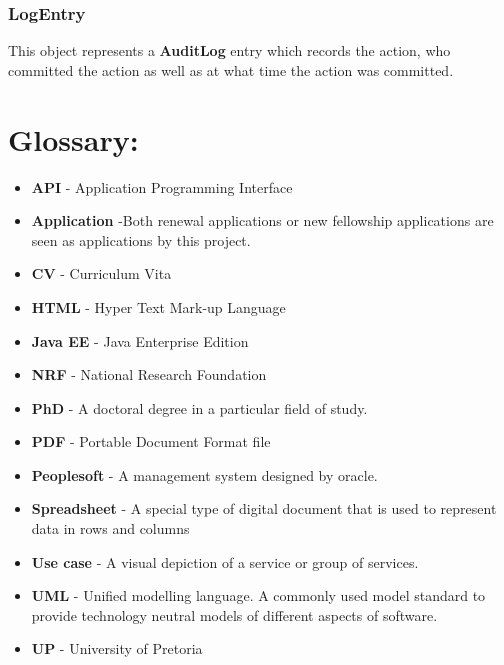 \documentclass[12pt]{article}
\begin{document}
\subsubsection{LogEntry}
This object represents a \textbf{AuditLog} entry which records the action, who committed the action as well as at what time the action was committed.



\newpage	

\newpage
\section{Glossary:}
\vspace{0.2in}

\begin{itemize}

\item \textbf{API} - Application Programming Interface
\item \textbf{Application} -Both renewal applications or new fellowship applications are seen as applications by this project.
\item \textbf{CV} - Curriculum Vita
\item \textbf{HTML} - Hyper Text Mark-up Language
\item \textbf{Java EE} - Java Enterprise Edition
\item \textbf{NRF} - National Research Foundation
\item \textbf{PhD} - A doctoral degree in a particular field of study.
\item \textbf{PDF} - Portable Document Format file
\item \textbf{Peoplesoft} - A management system designed by oracle. 
\item \textbf{Spreadsheet} - A special type of digital document that is used to represent data in rows and columns
\item \textbf{Use case} - A visual depiction of a service or group of services.
\item \textbf{UML} - Unified modelling language. A commonly used model standard to provide technology neutral models of different aspects of software.
\item \textbf{UP} - University of Pretoria
 


\end{itemize}	
\end{document}
